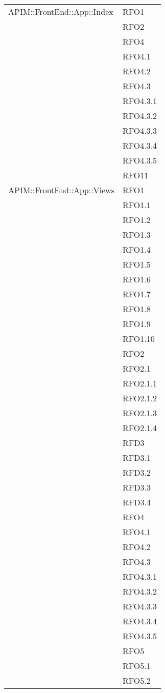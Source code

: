 \begin{longtable}{ p{12cm} | p{4cm} }
			\hline
			APIM::FrontEnd::App::Index
			& RFO1 \\
			& RFO2 \\
			& RFO4 \\
			& RFO4.1 \\
			& RFO4.2 \\
			& RFO4.3 \\
			& RFO4.3.1 \\
			& RFO4.3.2 \\
			& RFO4.3.3 \\
			& RFO4.3.4 \\
			& RFO4.3.5 \\
			& RFO11 \\
			\hline
			APIM::FrontEnd::App::Views
			& RFO1 \\
			& RFO1.1 \\
			& RFO1.2 \\
			& RFO1.3 \\
			& RFO1.4 \\
			& RFO1.5 \\
			& RFO1.6 \\
			& RFO1.7 \\
			& RFO1.8 \\
			& RFO1.9 \\
			& RFO1.10 \\
			& RFO2 \\
			& RFO2.1 \\
			& RFO2.1.1 \\
			& RFO2.1.2 \\
			& RFO2.1.3 \\
			& RFO2.1.4 \\
			& RFD3 \\
			& RFD3.1 \\
			& RFD3.2 \\
			& RFD3.3 \\
			& RFD3.4 \\
			& RFO4 \\
			& RFO4.1 \\
			& RFO4.2 \\
			& RFO4.3 \\
			& RFO4.3.1 \\
			& RFO4.3.2 \\
			& RFO4.3.3 \\
			& RFO4.3.4 \\
			& RFO4.3.5 \\
			& RFO5 \\
			& RFO5.1 \\
			& RFO5.2 \\

\end{longtable}
